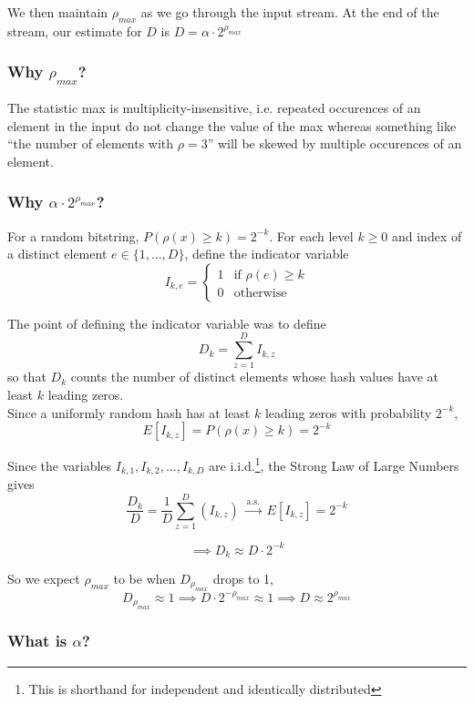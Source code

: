 \noindent We then maintain $\rho_{max}$ as we go through the input stream. At the end of the stream,
our estimate for \(D\) is $D = \alpha \cdot 2^{\rho_{max}}$

\subsubsection*{Why $\rho_{max}$?}

The statistic max is multiplicity-insensitive, i.e. repeated occurences of an element in the 
input do not change the value of the max whereas 
something like ``the number of elements with $\rho=3$'' will be skewed by 
multiple occurences of an element. 


\subsubsection*{Why $\alpha \cdot 2^{\rho_{max}}$?}
For a random bitstring, $P(\rho(x)\ge k)=2^{-k}$. For each level \(k\ge 0\) and 
index of a distinct element \(e\in\{1,\dots,D\}\), define the indicator variable\\
\[
I_{k,e}=
\begin{cases}
1 & \text{if $\rho(e)\ge k$}\\
0 & \text{otherwise}
\end{cases}
\]

\noindent The point of defining the indicator variable was to define
\[
D_k=\sum_{z=1}^{D} I_{k,z}
\]
so that \(D_k\) counts the number of distinct elements whose hash values have at least \(k\) leading zeros.\\


\noindent Since a uniformly random hash has at least \(k\) leading zeros with probability \(2^{-k}\),
\[
E[I_{k,z}]=P(\rho(x)\ge k)=2^{-k}
\]


\noindent Since the variables \(I_{k,1},I_{k,2},\dots,I_{k,D}\) are i.i.d.\footnote{This is shorthand 
for independent and identically distributed}, the Strong Law of Large Numbers gives
\[
\frac{D_k}{D}
=
\frac1D\sum_{z=1}^{D} \left(I_{k,z}\right)
\;\xrightarrow{\text{a.s.}}\;
E[I_{k,z}]
=
2^{-k}
\]

\vspace{1em}
\[
\implies
D_k \approx D\cdot 2^{-k}
\]

So we expect $\rho_{max}$ to be when $D_{\rho_{max}}$ drops to 1, 
\[
D_{\rho_{max}} \approx 1 \implies D \cdot 2^{-\rho_{max}} \approx 1 \implies D \approx 2^{\rho_{max}}
\]

\subsubsection*{What is $\alpha$?}

